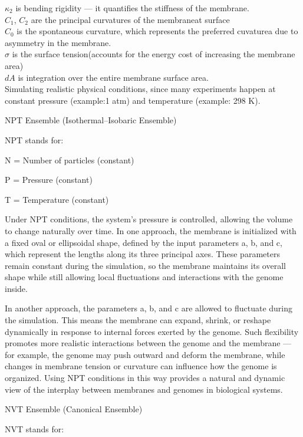 \documentclass[12pt]{article}
\begin{document}
\begin{flushleft}
\(\kappa_2\) is bending rigidity — it quantifies the stiffness of the membrane.\\

\(C_1\), \(C_2\) are the principal curvatures of the membraneat surface\\
\(C_0\) is the spontaneous curvature, which represents the preferred cuvaturea due to asymmetry in the membrane.\\
\(\sigma\) is the surface tension(accounts for the energy cost of increasing the membrane area)\\
\(dA\) is integration over the entire membrane surface area. \\



Simulating realistic physical conditions, since many experiments happen at constant pressure (example:1 atm) and temperature  (example: 298 K).

\noindent NPT Ensemble (Isothermal–Isobaric Ensemble)

NPT stands for:

    N = Number of particles (constant)

    P = Pressure (constant)

    T = Temperature (constant)
    
    Under NPT conditions, the system’s pressure is controlled, allowing the volume to change naturally over time. In one approach, the membrane is initialized with a fixed oval or ellipsoidal shape, defined by the input parameters a, b, and c, which represent the lengths along its three principal axes. These parameters remain constant during the simulation, so the membrane maintains its overall shape while still allowing local fluctuations and interactions with the genome inside.

In another approach, the parameters a, b, and c are allowed to fluctuate during the simulation. This means the membrane can expand, shrink, or reshape dynamically in response to internal forces exerted by the genome. Such flexibility promotes more realistic interactions between the genome and the membrane — for example, the genome may push outward and deform the membrane, while changes in membrane tension or curvature can influence how the genome is organized. Using NPT conditions in this way provides a natural and dynamic view of the interplay between membranes and genomes in biological systems.

\noindent NVT Ensemble (Canonical Ensemble)

NVT stands for:


\end{flushleft}
\end{document}
